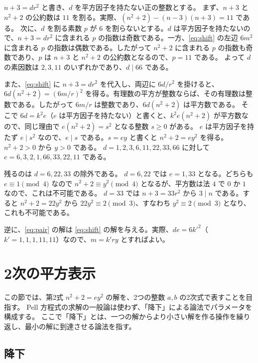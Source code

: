 \documentclass[a4paper,11pt]{ltjsarticle}
\makeatletter
\theoremstyle{jplain}
\renewcommand{\proofname}{証明}
\renewenvironment{proof}[1][\proofname]{\par\pushQED{\qed}\normalfont\topsep6\p@\@plus6\p@\relax
  \trivlist\item[\hskip\labelsep\bfseries #1]\ignorespaces}{\popQED\endtrivlist\@endpefalse}
\numberwithin{equation}{section}
\numberwithin{table}{section}
\makeatother
\begin{document}
\begin{proof}
$n+3=dr^2$ と書き、$d$ を平方因子を持たない正の整数とする。
まず、$n+3$ と $n^2+2$ の公約数は $11$ を割る。実際、$(n^2+2)-(n-3)(n+3)=11$ である。
次に、$d$ を割る素数 $p$ が $6$ を割らないとする。$d$ は平方因子を持たないので、$n+3=dr^2$ に含まれる $p$ の指数は奇数である。一方、\eqref{eq:shift} の左辺 $6m^2$ に含まれる $p$ の指数は偶数である。したがって $n^2+2$ に含まれる $p$ の指数も奇数であり、$p$ は $n+3$ と $n^2+2$ の公約数となるので、$p=11$ である。
よって $d$ の素因数は $2,3,11$ のいずれかであり、$d\mid66$ である。

また、\eqref{eq:shift} に $n+3=dr^2$ を代入し、両辺に $6d/r^2$ を掛けると、$6d(n^2+2)=(6m/r)^2$ を得る。有理数の平方が整数ならば、その有理数は整数である。したがって $6m/r$ は整数であり、$6d(n^2+2)$ は平方数である。
そこで $6d=k^2e$（$e$ は平方因子を持たない）と書くと、$k^2e(n^2+2)$ が平方数なので、同じ理由で $e(n^2+2)=s^2$ となる整数 $s\ge0$ がある。
$e$ は平方因子を持たず $e\mid s^2$ なので、$e\mid s$ である。$s=ey$ と書くと $n^2+2=ey^2$ を得る。$n^2+2>0$ から $y>0$ である。
$d=1,2,3,6,11,22,33,66$ に対して $e=6,3,2,1,66,33,22,11$ である。

残るのは $d=6,22,33$ の除外である。
$d=6,22$ では $e=1,33$ となる。どちらも $e\equiv1\pmod4$ なので $n^2+2\equiv y^2\pmod4$ となるが、平方数は法 $4$ で $0$ か $1$ なので、これは不可能である。
$d=33$ では $n+3=33r^2$ から $3\mid n$ である。すると $n^2+2=22y^2$ から $22y^2\equiv2\pmod3$、すなわち $y^2\equiv2\pmod3$ となり、これも不可能である。
\end{proof}

逆に、\eqref{eq:pair} の解は \eqref{eq:shift} の解を与える。実際、$de=6k'^2$（$k'=1,1,1,11,11$）なので、$m=k'ry$ とすればよい。

\section{2次の平方表示}\label{sec:parameters}

この節では、第2式 $n^2+2=ey^2$ の解を、2つの整数 $a,b$ の2次式で表すことを目指す。
Pell 方程式の求解の一般論は使わず、「降下」による論法でパラメータを構成する。
ここで「降下」とは、一つの解からより小さい解を作る操作を繰り返し、最小の解に到達させる論法を指す。

\subsection{降下}
\end{document}

